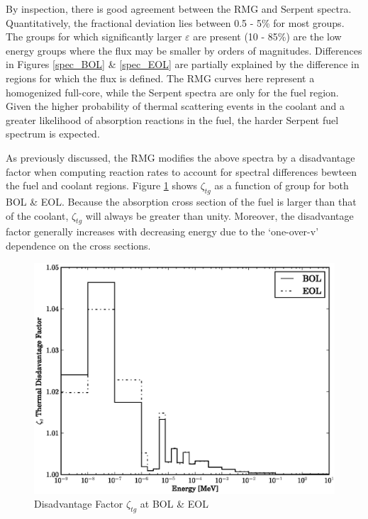 By inspection, there is good agreement between the RMG and Serpent spectra.  Quantitatively, 
the fractional deviation lies between 0.5 - 5\% for most groups.  The groups for which 
significantly larger $\varepsilon$ are present (10 - 85\%) are  the low energy groups 
where the flux may be smaller by orders of magnitudes.  Differences in Figures \ref{spec_BOL} \& 
\ref{spec_EOL} are partially explained by the difference in regions for which the flux is defined.
The RMG curves here represent a homogenized full-core, while the Serpent spectra are only for the 
fuel region.  Given the higher probability of thermal scattering events in the coolant and a greater likelihood of
absorption reactions in the fuel, the harder Serpent fuel spectrum is expected.

As previously discussed, the RMG modifies the above spectra by a disadvantage factor when computing 
reaction rates to account for spectral differences bewteen the fuel and coolant regions.
Figure \ref{zeta_BOL_EOL} shows $\zeta_{tg}$ as a function of group for both BOL \& EOL.
Because the absorption cross section of the fuel is larger than that of the coolant, 
$\zeta_{tg}$ will always be greater than unity.  Moreover, the disadvantage factor generally
increases with decreasing energy due to the `one-over-v' dependence on the cross sections. 

\begin{figure}[htbp]
\caption{Disadvantage Factor $\zeta_{tg}$ at BOL \& EOL}
\label{zeta_BOL_EOL}
\begin{center}
\includegraphics[scale=0.5]{multigroup_method/figs/benchmark/zeta.eps}
\end{center}
\end{figure}


